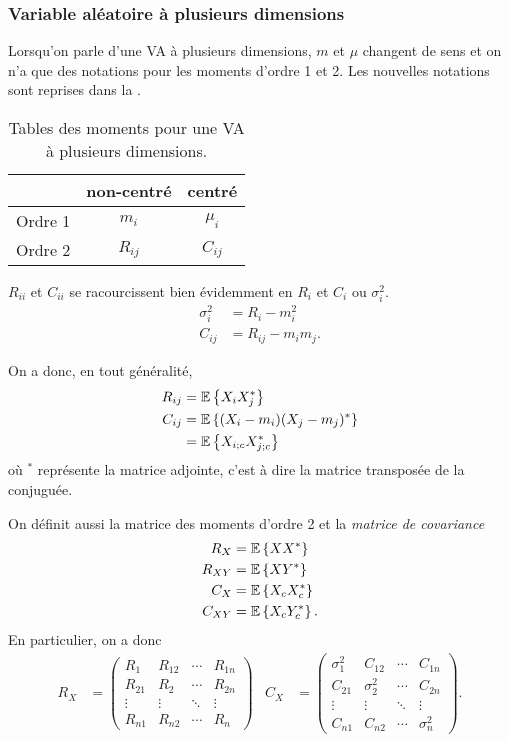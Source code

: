 \subsubsection{Variable aléatoire à plusieurs dimensions}
Lorsqu'on parle d'une VA à plusieurs dimensions,
$m$ et $\mu$ changent de sens et on n'a que des notations pour
les moments d'ordre 1 et 2.
Les nouvelles notations sont reprises dans la .
\begin{table}
  \centering
  \begin{tabular}{|l|c|c|}
    \hline
            & non-centré & centré\\
    \hline
    Ordre 1 & $m_i$      & $\mu_i$\\
    \hline
    Ordre 2 & $R_{ij}$   & $C_{ij}$\\ %
    \hline
  \end{tabular}
  \caption{Tables des moments pour une VA à plusieurs dimensions.}
  \label{tab:momentdim}
\end{table}
$R_{ii}$ et $C_{ii}$ se racourcissent bien évidemment en $R_i$
et $C_i$ ou $\sigma_i^2$.
\begin{align*}
  \sigma_i^2 & = R_i - m_i^2\\
  C_{ij}   & = R_{ij} - m_im_j.
\end{align*}

On a donc, en tout généralité,
\begin{align*}
  R_{ij} & = \mathbb{E}\left\{X_iX_j^*\right\}\\
  C_{ij} & = \mathbb{E}\left\{(X_i-m_i)(X_j-m_j)^*\right\}\\
         & = \mathbb{E}\left\{X_{i;c}X_{j;c}^*\right\}
\end{align*}
où $^*$ représente la matrice adjointe,
c'est à dire la matrice transposée de la conjuguée.

On définit aussi la matrice des moments d'ordre 2 et la \emph{matrice de covariance}
\begin{align*}
  R_X    & = \mathbb{E}\left\{X X^*\right\}\\
  R_{XY} & = \mathbb{E}\left\{X Y^*\right\}\\
  C_X    & = \mathbb{E}\left\{X_c X_c^*\right\}\\
  C_{XY} & = \mathbb{E}\left\{X_c Y_c^*\right\}.
\end{align*}
En particulier, on a donc
\begin{align*}
  R_X & =
    \begin{pmatrix}
      R_1        & R_{12} & \cdots & R_{1n}\\
      R_{21}     & R_2 & \cdots & R_{2n}\\
      \vdots     & \vdots & \ddots & \vdots\\
      R_{n1}     & R_{n2} & \cdots & R_n
    \end{pmatrix} &
  C_X & =
  \begin{pmatrix}
    \sigma_1^2 & C_{12}     & \cdots & C_{1n}\\
    C_{21}     & \sigma_2^2 & \cdots & C_{2n}\\
    \vdots     & \vdots     & \ddots & \vdots\\
    C_{n1}     & C_{n2}     & \cdots & \sigma_n^2
  \end{pmatrix}.
\end{align*}

